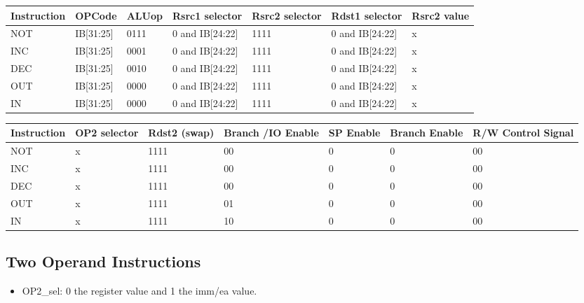 \begin{center}
\begin{tabular}{||p{20mm}| p{15mm}| p{15mm}| p{15mm}| p{15mm}| p{15mm}| p{15mm}||} 
\hline
Instruction & OPCode & ALUop & Rsrc1 selector & Rsrc2 selector & Rdst1 selector & Rsrc2 value \\ [0.5ex] 
\hline\hline
NOT & IB[31:25] & 0111 & 0 and IB[24:22] & 1111 & 0 and IB[24:22] & x  \\
\hline
INC & IB[31:25] & 0001 & 0 and IB[24:22] & 1111 & 0 and IB[24:22] & x \\
\hline
DEC & IB[31:25] & 0010 & 0 and IB[24:22] & 1111 & 0 and IB[24:22] & x \\
\hline
OUT & IB[31:25] & 0000 & 0 and IB[24:22] & 1111 & 0 and IB[24:22] & x \\
\hline
IN  & IB[31:25] & 0000 & 0 and IB[24:22] & 1111 & 0 and IB[24:22] & x \\
\hline
\end{tabular}
\end{center}

\begin{center}
\begin{tabular}{||p{20mm}| p{15mm}| p{15mm}| p{15mm}| p{15mm}| p{15mm}| p{15mm}||} 
\hline
Instruction & OP2 selector & Rdst2 (swap) & Branch /IO Enable & SP Enable & Branch Enable & R/W Control Signal \\ [0.5ex] 
\hline\hline
NOT & x & 1111 & 00 & 0 & 0 & 00 \\
\hline
INC & x & 1111 & 00 & 0 & 0 & 00 \\
\hline
DEC & x & 1111 & 00 & 0 & 0 & 00 \\
\hline
OUT & x & 1111 & 01 & 0 & 0 & 00 \\
\hline
IN  & x & 1111 & 10 & 0 & 0 & 00 \\
\hline
\end{tabular}
\end{center}

\subsection{Two Operand Instructions}
\begin{itemize}
    \item OP2\_sel: 0 the register value and 1 the imm/ea value.
\end{itemize}

